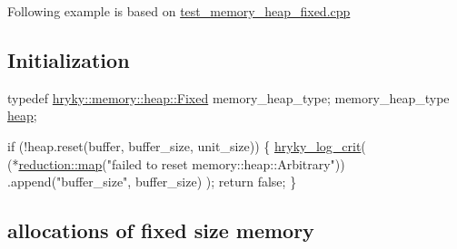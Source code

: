 Following example is based on \hyperlink{test_memory_heap_fixed_8cpp-example}{test\-\_\-memory\-\_\-heap\-\_\-fixed.\-cpp}

\hypertarget{hryky_1_1task_Initialization}{}\subsection{Initialization}\label{hryky_1_1task_Initialization}

\begin{DoxyCodeInclude}
    \textcolor{keyword}{typedef} \hyperlink{classhryky_1_1memory_1_1heap_1_1_fixed}{hryky::memory::heap::Fixed} memory\_heap\_type;
    memory\_heap\_type \hyperlink{namespacehryky_1_1memory_1_1global_a6fc6103f67c837aa0f39b359588409cd}{heap};

    \textcolor{keywordflow}{if} (!heap.reset(buffer, buffer\_size, unit\_size)) \{
        \hyperlink{log__writer__common_8h_a61bcce4d8e91e6fde78ce1be7d9ceac8}{hryky_log_crit}(
            (*\hyperlink{namespacehryky_1_1reduction_ac5eae270cf8047b294dc4ff3e5e11a79}{reduction::map}(\textcolor{stringliteral}{"failed to reset memory::heap::Arbitrary"}))
            .append(\textcolor{stringliteral}{"buffer\_size"}, buffer\_size)
            );
        \textcolor{keywordflow}{return} \textcolor{keyword}{false};
    \}

\end{DoxyCodeInclude}
\hypertarget{hryky_1_1memory_allocation}{}\subsection{allocations of fixed size memory}\label{hryky_1_1memory_allocation}

